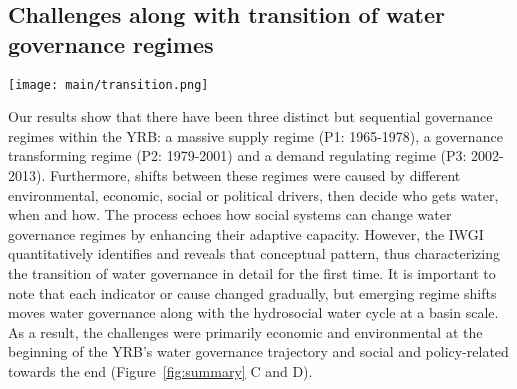 \subsection{Challenges along with transition of water governance regimes}

\begin{figure*}[htbp!]
	\centering
	\texttt{[image: main/transition.png]}
	\caption{
		Transition schema of water governance during transformation towards a hydrosocial water cycle. The natural water cycle dominates blue pathways while socio-economic feedbacks dominate red pathways. Finally, there is a transformation towards the hydrosocial water cycle where red loop increases.
		\textbf{A. Early phase.} As socio-economic systems develop, industry and services gradually demand increasing amounts of water; at the same time, increasing social organization and technological capacity allow people to manage water resources more intensively, including intensive intervention in the natural water cycle.
		\textbf{B. Late phase} With further developed and economically efficient industries and services, trade-offs between provisioning-purpose and non-provisioning water use become prominent. Rather than being determined by local socio-economic systems, water withdraws and management are scaled up to the entire basin.
		Thus, \textbf{C. Transformation from a natural water cycle towards the hydro-social water cycle} occurs in paralleled with a transformation towards a hydrosocial water cycle. This is generally distinguished when water resource limits are reached. The three water governance regimes seen in the YRB are identified along this transition (Regime 1: massive supply regime, Regime 2: purpose-focused regime, Regime 3: many-sided governance regime).
		\textbf{D. Water governance challenges} Through the transitional regimes, water governance faces primarily economic and environmental challenges in the early phase and social and policy challenges in the late phase.
	}
	\label{fig:summary}
\end{figure*}

Our results show that there have been three distinct but sequential governance regimes within the YRB: a massive supply regime (P1: 1965-1978), a governance transforming regime (P2: 1979-2001) and a demand regulating regime (P3: 2002-2013).
Furthermore, shifts between these regimes were caused by different environmental, economic, social or political drivers, then decide who gets water, when and how.
The process echoes how social systems can change water governance regimes by enhancing their adaptive capacity. %
However, the IWGI quantitatively identifies and reveals that conceptual pattern, thus characterizing the transition of water governance in detail for the first time.
It is important to note that each indicator or cause changed gradually, but emerging regime shifts moves water governance along with the hydrosocial water cycle at a basin scale.
As a result, the challenges were primarily economic and environmental at the beginning of the YRB's water governance trajectory and social and policy-related towards the end (Figure~\ref{fig:summary} C and D).

